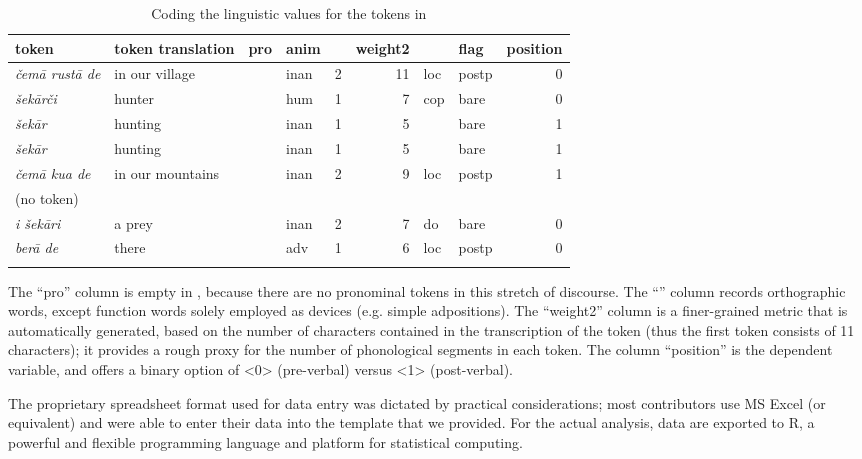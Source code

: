 \documentclass[output=paper,colorlinks,citecolor=brown,collectionchapter]{langscibook}
\begin{document}
\begin{table}
\footnotesize
    \begin{tabularx}{\textwidth}{QQllrrllr}
\lsptoprule
token & token translation & pro & anim &  & weight2 &  & flag & position \\
\midrule
\textit{čemā rustā de} & in our village &  & inan & 2 & 11 & loc & postp & 0 \\
\tablevspace
\textit{šekārči} & hunter &  & hum & 1 & 7 & cop & bare & 0 \\
\tablevspace
\textit{šekār} & hunting &  & inan & 1 & 5 &  & bare & 1 \\
\tablevspace
\textit{šekār} & hunting &  & inan & 1 & 5 &   & bare & 1 \\
\tablevspace
\textit{čemā kua de} & in our mountains &  & inan & 2 & 9 & loc & postp & 1 \\
\tablevspace
(no token) &  &  &  &  &  &  &  & \\
\tablevspace
\textit{i šekāri} & a prey &  & inan & 2 & 7 & do & bare & 0 \\
\tablevspace
\textit{berā de} & there &  & adv & 1 & 6 & loc & postp & 0 \\
\lspbottomrule
    \end{tabularx}
    \caption{Coding the linguistic values for the tokens in }
    \label{Intro:tab:2}
\end{table}

The ``pro'' column is empty in , because there are no pronominal tokens in this stretch of discourse. The ``'' column records orthographic words, except function words solely employed as  devices (e.g. simple adpositions). The ``weight2'' column is a finer-grained  metric that is automatically generated, based on the number of characters contained in the transcription of the token (thus the first token consists of 11 characters); it provides a rough proxy for the number of phonological segments in each token. The column ``position'' is the dependent variable, and offers a binary option of <0> (pre-verbal) versus <1> (post-verbal).

\largerpage
The proprietary spreadsheet format used for data entry was dictated by practical considerations; most contributors use MS Excel (or equivalent) and were able to enter their data into the template that we provided. For the actual analysis, data are exported to R, a powerful and flexible programming language and platform for statistical computing.
\end{document}
